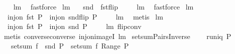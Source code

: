 \begin{isabellebody}
%
\isadelimproof
\ \ %
\endisadelimproof
%
\isatagproof
{}\isamarkupfalse%
\ lm{}{}{}\ \isamarkupfalse%
\ fastforce%
\endisatagproof
{\isafoldproof}%
%
\isadelimproof
\isanewline
%
\endisadelimproof
\isanewline
{}\isamarkupfalse%
\ lm{}{}{}{\isacharcolon}\ \isanewline
\ \ {\isachardoublequoteopen}snd\ {\isacharequal}\ {\isacharparenleft}fst{\isasymcirc}flip{\isacharparenright}{\isachardoublequoteclose}\ \isanewline
%
\isadelimproof
\ \ %
\endisadelimproof
%
\isatagproof
{}\isamarkupfalse%
\ lm{}{}{}\ \isamarkupfalse%
\ fastforce%
\endisatagproof
{\isafoldproof}%
%
\isadelimproof
\isanewline
%
\endisadelimproof
\isanewline
{}\isamarkupfalse%
\ lm{}{}{}{\isacharcolon}\ \isanewline
\ \ {\isachardoublequoteopen}inj{\isacharunderscore}on\ fst\ P\ {\isacharequal}\ inj{\isacharunderscore}on\ {\isacharparenleft}snd{\isasymcirc}flip{\isacharparenright}\ P{\isachardoublequoteclose}\ \isanewline
%
\isadelimproof
\ \ %
\endisadelimproof
%
\isatagproof
{}\isamarkupfalse%
\ lm{}{}{}\ \isamarkupfalse%
\ metis%
\endisatagproof
{\isafoldproof}%
%
\isadelimproof
\isanewline
%
\endisadelimproof
\isanewline
{}\isamarkupfalse%
\ lm{}{}{}{\isacharcolon}\ \isanewline
\ \ {\isachardoublequoteopen}inj{\isacharunderscore}on\ fst\ P\ {\isacharequal}\ inj{\isacharunderscore}on\ snd\ {\isacharparenleft}P{\isacharcircum}{\isacharminus}{}{\isacharparenright}{\isachardoublequoteclose}\ \isanewline
%
\isadelimproof
\ \ %
\endisadelimproof
%
\isatagproof
{}\isamarkupfalse%
\ lm{}{}{}\ flip{\isacharunderscore}conv\ \isamarkupfalse%
\ {\isacharparenleft}metis\ converse{\isacharunderscore}converse\ inj{\isacharunderscore}on{\isacharunderscore}imageI\ lm{}{}{}{\isacharparenright}%
\endisatagproof
{\isafoldproof}%
%
\isadelimproof
\isanewline
%
\endisadelimproof
\isanewline
{}\isamarkupfalse%
\ setsumPairsInverse{\isacharcolon}\ \isanewline
\ \ \ {\isachardoublequoteopen}runiq\ {\isacharparenleft}P{\isacharcircum}{\isacharminus}{}{\isacharparenright}{\isachardoublequoteclose}\ \isanewline
\ \ \ {\isachardoublequoteopen}setsum\ {\isacharparenleft}f\ {\isasymcirc}\ snd{\isacharparenright}\ P\ {\isacharequal}\ setsum\ f\ {\isacharparenleft}Range\ P{\isacharparenright}{\isachardoublequoteclose}\ \isanewline

\end{isabellebody}
